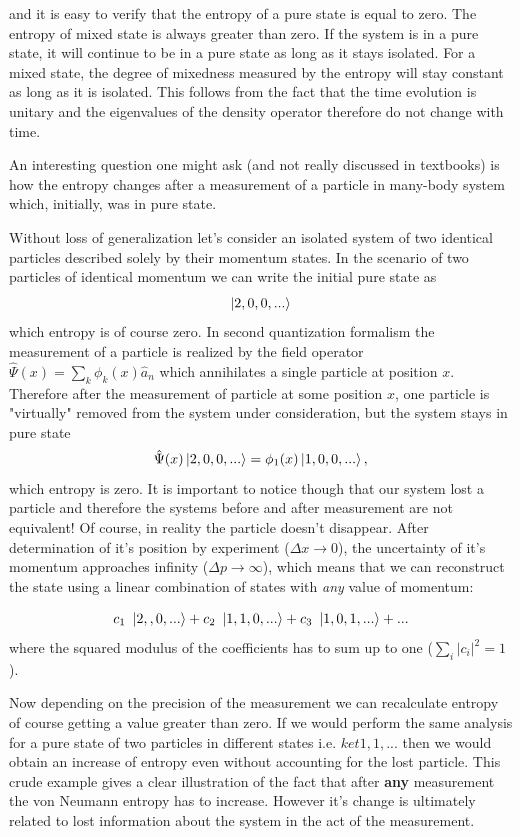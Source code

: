 \documentclass[a4paper,12pt]{article}
\begin{document}
and it is easy to verify that the entropy of a pure state is equal to zero. The entropy of mixed state is always greater than zero.
If the system is in a pure state, it will continue to be in a pure state as long as it stays isolated. For a mixed state, the degree of mixedness measured by the entropy will stay constant as long as it is isolated. This follows from the fact that the time evolution is unitary and the eigenvalues of the density operator therefore do not change with time.

An interesting question one might ask (and not really discussed in textbooks) is how the entropy changes after a measurement of a particle in many-body system which, initially, was in pure state.

Without loss of generalization let's consider an isolated system of two identical particles described solely by their momentum states.
In the scenario of two particles of identical momentum we can write the initial pure state as 
\begin{equation}
  \ket{2,0,0,...}
\end{equation}
which entropy is of course zero.  
In second quantization formalism the measurement of a particle is realized by the field operator $ \hat{\Psi}(x) =\sum_k \phi_k(x)\hat{a}_n$ which annihilates a single particle at position $x$.
Therefore after the measurement of particle at some position $x$, one particle is "virtually" removed from the system under consideration, but the system stays in pure state
\begin{equation}
  \hat{\Psi}(x)\ket{2,0,0,...}=\phi_1(x)\ket{1,0,0,...},
\end{equation}
which entropy is zero. It is important to notice though that our system lost a particle and therefore the systems before and after measurement are not equivalent! Of course, in reality the particle doesn't disappear. After determination of it's position by experiment ($\Delta x \to 0$), the uncertainty of it's momentum approaches infinity ($\Delta p \to \infty$), which means that we can reconstruct the state using a linear combination of states with \textit{any} value of momentum:

\begin{equation}
  c_1\ \ket{2,,0,...}+c_2\ \ket{1,1,0,...}+  c_3\ \ket{1,0,1,...}+...
\end{equation}
where the  squared modulus of the coefficients has to sum up to one ($ \sum_i \left| c_i \right|^2 = 1 $).

Now depending on the precision of the measurement we can recalculate entropy of course getting a value greater than zero. If we would perform the same analysis for a pure state of two particles in different states i.e. $ket{1,1,...}$ then we would obtain an increase of entropy even without accounting for the lost particle.
This crude example gives a clear illustration of the fact that after \textbf{any} measurement the von Neumann entropy has to increase. However it's change is ultimately related to lost information about the system in the act of the measurement.
\end{document}
